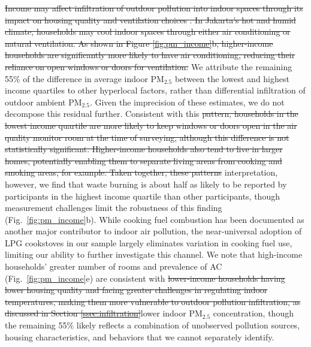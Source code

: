 \documentclass[reqno,12pt,notitlepage]{article}
\providecommand{\DIFadd}[1]{{\protect\color{BLUE}#1}} %
\providecommand{\DIFdel}[1]{{\protect\color{red}\sout{#1}}} %
\providecommand{\DIFaddbegin}{} %
\providecommand{\DIFaddend}{} %
\providecommand{\DIFdelbegin}{} %
\providecommand{\DIFdelend}{} %
\begin{document}
\DIFdelbegin \DIFdel{Income may affect infiltration of outdoor pollution into indoor spaces through its impact on housing quality and ventilation choices \citep{lunderberg_assessing_2023}. In Jakarta's hot and humid climate, households may cool indoor spaces through either air conditioning or natural ventilation. As shown in Figure \ref{fig:pm_income}b, higher-income households are significantly more likely to have air conditioning, reducing their reliance on open windows or doors for ventilation. }\DIFdelend \DIFaddbegin \DIFadd{We attribute the remaining 55\% of the difference in average indoor PM$_{2.5}$ between the lowest and highest income quartiles to other hyperlocal factors, rather than differential infiltration of outdoor ambient PM$_{2.5}$. Given the imprecision of these estimates, we do not decompose this residual further. }\DIFaddend Consistent with this \DIFdelbegin \DIFdel{pattern, households in the lowest income quartile are more likely to keep windows or doors open in the air quality monitor room at the time of surveying, although this difference is not statistically significant. Higher-income households also tend to live in larger homes, potentially enabling them to separate living areas from cooking and smoking areas, for example. Taken together, these patterns }\DIFdelend \DIFaddbegin \DIFadd{interpretation, however, we find that waste burning is about half as likely to be reported by participants in the highest income quartile than other participants, though measurement challenges limit the robustness of this finding (Fig.\ \ref{fig:pm_income}b). While cooking fuel combustion has been documented as another major contributor to indoor air pollution, the near-universal adoption of LPG cookstoves in our sample largely eliminates variation in cooking fuel use, limiting our ability to further investigate this channel. We note that high-income households' greater number of rooms and prevalence of AC (Fig.\ \ref{fig:pm_income}e) }\DIFaddend are consistent with \DIFdelbegin \DIFdel{lower-income households having lower housing quality and facing greater challenges in regulating indoor temperatures, making them more vulnerable to outdoor pollution infiltration, as discussed in Section \ref{ssec:infiltration}}\DIFdelend \DIFaddbegin \DIFadd{lower indoor PM$_{2.5}$ concentration, though the remaining 55\% likely reflects a combination of unobserved pollution sources, housing characteristics, and behaviors that we cannot separately identify}\DIFaddend .
\end{document}
